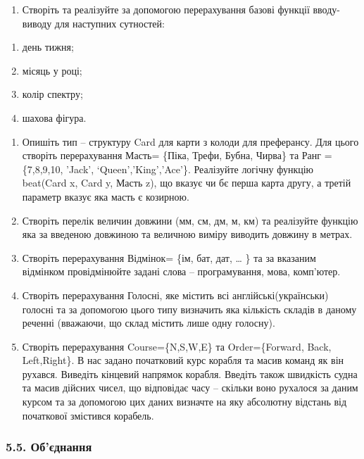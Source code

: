 \documentclass[]{article}
\begin{document}
\begin{enumerate}
\def\labelenumi{\arabic{enumi})}
\item
  Створіть та реалізуйте за допомогою перерахування базові функції
  вводу-виводу для наступних сутностей:
\end{enumerate}

\begin{enumerate}
\def\labelenumi{\alph{enumi})}
\item
  день тижня;
\item
  місяць у році;
\item
  колір спектру;
\item
  шахова фігура.
\end{enumerate}

\begin{enumerate}
\def\labelenumi{\arabic{enumi})}
\item
  Опишіть тип -- структуру Card для карти з колоди для преферансу. Для
  цього створіть перерахування Масть= \{Піка, Трефи, Бубна, Чирва\} та
  Ранг =\{7,8,9,10, 'Jack', `Queen','King','Ace'\}. Реалізуйте логічну
  функцію beat(Card x, Card y, Масть z), що вказує чи бє перша карта
  другу, а третій параметр вказує яка масть є козирною.
\item
  \protect\hypertarget{_Hlk48906187}{}{}Створіть перелік величин довжини
  (мм, см, дм, м, км) та реалізуйте функцію яка за введеною довжиною та
  величною виміру виводить довжину в метрах.
\item
  Створіть перерахування Відмінок= \{ім, бат, дат, \ldots{} \} та за
  вказаним відмінком провідмінюйте задані слова -- програмування, мова,
  комп'ютер.
\item
  Створіть перерахування Голосні, яке містить всі англійські(українськи)
  голосні та за допомогою цього типу визначить яка кількість складів в
  даному реченні (вважаючи, що склад містить лише одну голосну).
\item
  Створіть перерахування Course=\{N,S,W,E\} та Order=\{Forward, Back,
  Left,Right\}. В нас задано початковий курс корабля та масив команд як
  він рухався. Виведіть кінцевий напрямок корабля. Введіть також
  швидкість судна та масив дійсних чисел, що відповідає часу -- скільки
  воно рухалося за даним курсом та за допомогою цих даних визначте на
  яку абсолютну відстань від початкової змістився корабель.
\end{enumerate}

\subsubsection{5.5.
Об'єднання}\label{ux43eux431ux454ux434ux43dux430ux43dux43dux44f}
\end{document}
